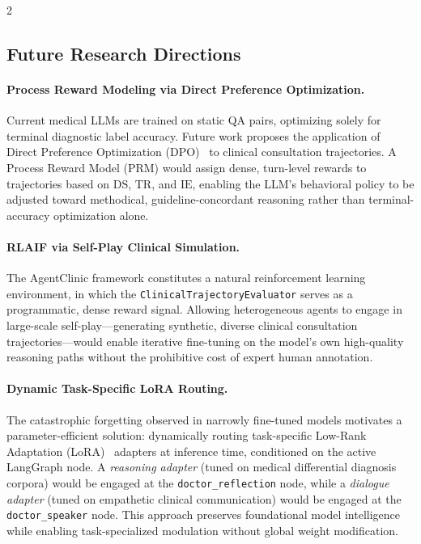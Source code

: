 \documentclass[10pt, a4paper]{article}
\newcommand{\DS}{\mathrm{DS}}
\newcommand{\TR}{\mathrm{TR}}
\newcommand{\IE}{\mathrm{IE}}
\begin{document}
\begin{multicols}{2}
\subsection{Future Research Directions}

\paragraph{Process Reward Modeling via Direct Preference Optimization.}
Current medical LLMs are trained on static QA pairs, optimizing solely for terminal diagnostic label accuracy. Future work proposes the application of Direct Preference Optimization (DPO)~\cite{rafailov2024direct} to clinical consultation trajectories. A Process Reward Model (PRM) would assign dense, turn-level rewards to trajectories based on $\DS$, $\TR$, and $\IE$, enabling the LLM's behavioral policy to be adjusted toward methodical, guideline-concordant reasoning rather than terminal-accuracy optimization alone.

\paragraph{RLAIF via Self-Play Clinical Simulation.}
The AgentClinic framework constitutes a natural reinforcement learning environment, in which the \texttt{ClinicalTrajectoryEvaluator} serves as a programmatic, dense reward signal. Allowing heterogeneous agents to engage in large-scale self-play—generating synthetic, diverse clinical consultation trajectories—would enable iterative fine-tuning on the model's own high-quality reasoning paths without the prohibitive cost of expert human annotation.

\paragraph{Dynamic Task-Specific LoRA Routing.}
The catastrophic forgetting observed in narrowly fine-tuned models motivates a parameter-efficient solution: dynamically routing task-specific Low-Rank Adaptation (LoRA)~\cite{hu2022lora} adapters at inference time, conditioned on the active LangGraph node. A \textit{reasoning adapter} (tuned on medical differential diagnosis corpora) would be engaged at the \texttt{doctor\_reflection} node, while a \textit{dialogue adapter} (tuned on empathetic clinical communication) would be engaged at the \texttt{doctor\_speaker} node. This approach preserves foundational model intelligence while enabling task-specialized modulation without global weight modification.


\end{multicols}
\end{document}
